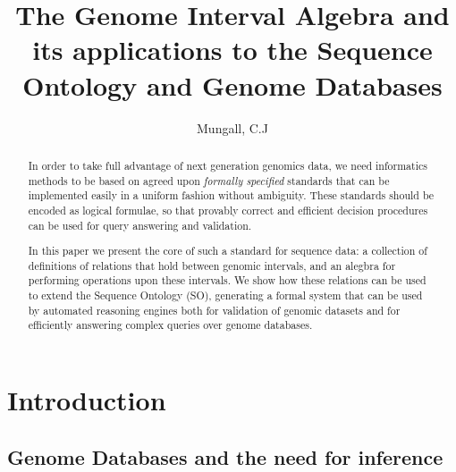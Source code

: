 \documentclass{article}
\begin{document}
% 

\title{The Genome Interval Algebra and its applications to the Sequence Ontology and Genome Databases}
\author{
  Mungall, C.J
}

\maketitle              %


\begin{abstract}

  In order to take full advantage of next generation genomics data, we
  need informatics methods to be based on agreed upon \emph{formally
    specified} standards that can be implemented easily in a uniform
  fashion without ambiguity. These standards should be encoded as
  logical formulae, so that provably correct and efficient decision
  procedures can be used for query answering and validation.

  In this paper we present the core of such a standard for sequence
  data: a collection of definitions of relations that hold between
  genomic intervals, and an alegbra for performing operations upon
  these intervals. We show how these relations can be used to extend
  the Sequence Ontology (SO), generating a formal system that can be
  used by automated reasoning engines both for validation of genomic
  datasets and for efficiently answering complex queries over genome
  databases.

\end{abstract}


\section{Introduction}

\subsection{Genome Databases and the need for inference}

\end{document}
